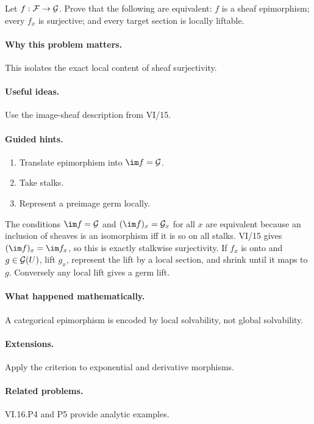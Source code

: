 \begin{problem}\label{prob:vi16-p03}
Let $f:\mathcal F\to\mathcal G$.  Prove that the following are equivalent: $f$ is a sheaf epimorphism; every $f_x$ is surjective; and every target section is locally liftable.
\end{problem}

\ifdefined\FullProblemDossiers
\paragraph{Why this problem matters.}
This isolates the exact local content of sheaf surjectivity.

\paragraph{Useful ideas.}
Use the image-sheaf description from VI/15.

\paragraph{Guided hints.}
\begin{enumerate}
\item Translate epimorphism into $\im f=\G$.
\item Take stalks.
\item Represent a preimage germ locally.
\end{enumerate}

\begin{solution}
The conditions $\im f=\G$ and $(\im f)_x=\G_x$ for all $x$ are equivalent because an inclusion of sheaves is an isomorphism iff it is so on all stalks.  VI/15 gives $(\im f)_x=\im f_x$, so this is exactly stalkwise surjectivity.  If $f_x$ is onto and $g\in\mathcal G(U)$, lift $g_x$, represent the lift by a local section, and shrink until it maps to $g$.  Conversely any local lift gives a germ lift.
\end{solution}

\paragraph{What happened mathematically.}
A categorical epimorphism is encoded by local solvability, not global solvability.

\paragraph{Extensions.}
Apply the criterion to exponential and derivative morphisms.

\paragraph{Related problems.}
VI.16.P4 and P5 provide analytic examples.
\fi
